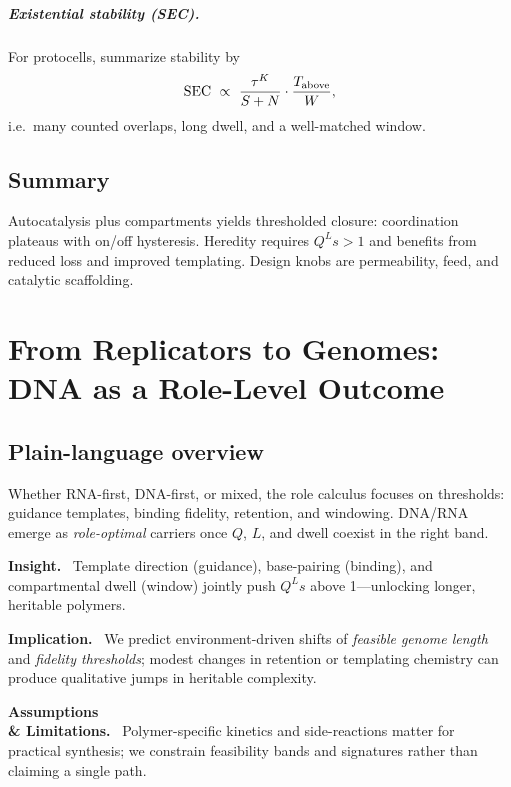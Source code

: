 \documentclass[12pt,a4paper,oneside]{scrreprt}
\newenvironment{insight}{\par\vspace{0.5em}\noindent\textbf{Insight.}\ }{\par\vspace{0.5em}}
\newenvironment{implication}{\par\vspace{0.5em}\noindent\textbf{Implication.}\ }{\par\vspace{0.5em}}
\newenvironment{limitation}{\par\vspace{0.5em}\noindent\textbf{Assumptions \\ \& Limitations.}\ }{\par\vspace{0.5em}}
\begin{document}
\paragraph{Existential stability (SEC).}
For protocells, summarize stability by 
\[
\mathrm{SEC}\ \propto\ \frac{\tau^K}{S+N}\cdot\frac{T_{\rm above}}{W},
\]
i.e.\ many counted overlaps, long dwell, and a well-matched window.

\section*{Summary}
Autocatalysis plus compartments yields thresholded closure: coordination plateaus with on/off hysteresis. 
Heredity requires $Q^L s>1$ and benefits from reduced loss and improved templating. 
Design knobs are permeability, feed, and catalytic scaffolding.

\chapter{From Replicators to Genomes: DNA as a Role-Level Outcome}\label{ch:life-dna}

\section*{Plain-language overview}
Whether RNA-first, DNA-first, or mixed, the role calculus focuses on thresholds: guidance templates, binding fidelity, retention, and windowing. 
DNA/RNA emerge as \emph{role-optimal} carriers once $Q$, $L$, and dwell coexist in the right band.

\begin{insight}
Template direction (guidance), base-pairing (binding), and compartmental dwell (window) jointly push $Q^L s$ above 1—unlocking longer, heritable polymers.
\end{insight}

\begin{implication}
We predict environment-driven shifts of \emph{feasible genome length} and \emph{fidelity thresholds}; modest changes in retention or templating chemistry can produce qualitative jumps in heritable complexity.
\end{implication}

\begin{limitation}
Polymer-specific kinetics and side-reactions matter for practical synthesis; we constrain feasibility bands and signatures rather than claiming a single path.
\end{limitation}
\end{document}
